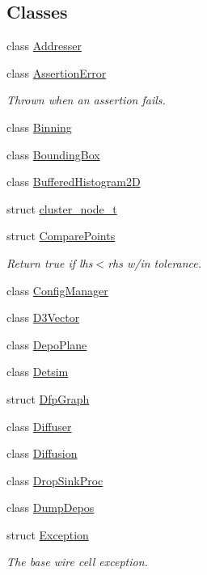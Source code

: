 \subsection*{Classes}
\begin{DoxyCompactItemize}
\item 
class \hyperlink{class_wire_cell_1_1_addresser}{Addresser}
\item 
class \hyperlink{class_wire_cell_1_1_assertion_error}{Assertion\+Error}
\begin{DoxyCompactList}\small\item\em Thrown when an assertion fails. \end{DoxyCompactList}\item 
class \hyperlink{class_wire_cell_1_1_binning}{Binning}
\item 
class \hyperlink{class_wire_cell_1_1_bounding_box}{Bounding\+Box}
\item 
class \hyperlink{class_wire_cell_1_1_buffered_histogram2_d}{Buffered\+Histogram2D}
\item 
struct \hyperlink{struct_wire_cell_1_1cluster__node__t}{cluster\+\_\+node\+\_\+t}
\item 
struct \hyperlink{struct_wire_cell_1_1_compare_points}{Compare\+Points}
\begin{DoxyCompactList}\small\item\em Return true if lhs$<$rhs w/in tolerance. \end{DoxyCompactList}\item 
class \hyperlink{class_wire_cell_1_1_config_manager}{Config\+Manager}
\item 
class \hyperlink{class_wire_cell_1_1_d3_vector}{D3\+Vector}
\item 
class \hyperlink{class_wire_cell_1_1_depo_plane}{Depo\+Plane}
\item 
class \hyperlink{class_wire_cell_1_1_detsim}{Detsim}
\item 
struct \hyperlink{struct_wire_cell_1_1_dfp_graph}{Dfp\+Graph}
\item 
class \hyperlink{class_wire_cell_1_1_diffuser}{Diffuser}
\item 
class \hyperlink{class_wire_cell_1_1_diffusion}{Diffusion}
\item 
class \hyperlink{class_wire_cell_1_1_drop_sink_proc}{Drop\+Sink\+Proc}
\item 
class \hyperlink{class_wire_cell_1_1_dump_depos}{Dump\+Depos}
\item 
struct \hyperlink{struct_wire_cell_1_1_exception}{Exception}
\begin{DoxyCompactList}\small\item\em The base wire cell exception. \end{DoxyCompactList}\item 

\end{DoxyCompactItemize}
